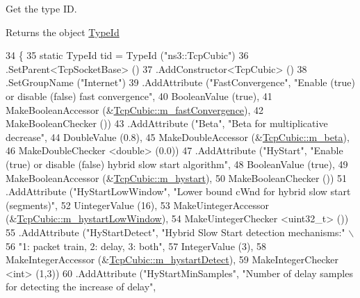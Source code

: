 Get the type ID. 

\begin{DoxyReturn}{Returns}
the object \hyperlink{classns3_1_1TypeId}{Type\+Id} 
\end{DoxyReturn}

\begin{DoxyCode}
34 \{
35   \textcolor{keyword}{static} TypeId tid = TypeId (\textcolor{stringliteral}{"ns3::TcpCubic"})
36     .SetParent<TcpSocketBase> ()
37     .AddConstructor<TcpCubic> ()
38     .SetGroupName (\textcolor{stringliteral}{"Internet"})
39     .AddAttribute (\textcolor{stringliteral}{"FastConvergence"}, \textcolor{stringliteral}{"Enable (true) or disable (false) fast convergence"},
40                    BooleanValue (\textcolor{keyword}{true}),
41                    MakeBooleanAccessor (&\hyperlink{classns3_1_1TcpCubic_a90051598ce6276440db0c3b5c0118ebf}{TcpCubic::m\_fastConvergence}),
42                    MakeBooleanChecker ())
43     .AddAttribute (\textcolor{stringliteral}{"Beta"}, \textcolor{stringliteral}{"Beta for multiplicative decrease"},
44                    DoubleValue (0.8),
45                    MakeDoubleAccessor (&\hyperlink{classns3_1_1TcpCubic_a71879d000e1dcba749c4fae90c8e873d}{TcpCubic::m\_beta}),
46                    MakeDoubleChecker <double> (0.0))
47     .AddAttribute (\textcolor{stringliteral}{"HyStart"}, \textcolor{stringliteral}{"Enable (true) or disable (false) hybrid slow start algorithm"},
48                    BooleanValue (\textcolor{keyword}{true}),
49                    MakeBooleanAccessor (&\hyperlink{classns3_1_1TcpCubic_a2df1ddb29a2f2a8e1f1886665a92f687}{TcpCubic::m\_hystart}),
50                    MakeBooleanChecker ())
51     .AddAttribute (\textcolor{stringliteral}{"HyStartLowWindow"}, \textcolor{stringliteral}{"Lower bound cWnd for hybrid slow start (segments)"},
52                    UintegerValue (16),
53                    MakeUintegerAccessor (&\hyperlink{classns3_1_1TcpCubic_af23b1714553886c496927ba6d75269b4}{TcpCubic::m\_hystartLowWindow}),
54                    MakeUintegerChecker <uint32\_t> ())
55     .AddAttribute (\textcolor{stringliteral}{"HyStartDetect"}, \textcolor{stringliteral}{"Hybrid Slow Start detection mechanisms:"} \(\backslash\)
56                    \textcolor{stringliteral}{"1: packet train, 2: delay, 3: both"},
57                    IntegerValue (3),
58                    MakeIntegerAccessor (&\hyperlink{classns3_1_1TcpCubic_a34e8c17f1c5c470fa39aa77d6d1bbda5}{TcpCubic::m\_hystartDetect}),
59                    MakeIntegerChecker <int> (1,3))
60     .AddAttribute (\textcolor{stringliteral}{"HyStartMinSamples"}, \textcolor{stringliteral}{"Number of delay samples for detecting the increase of delay"},

\end{DoxyCode}
